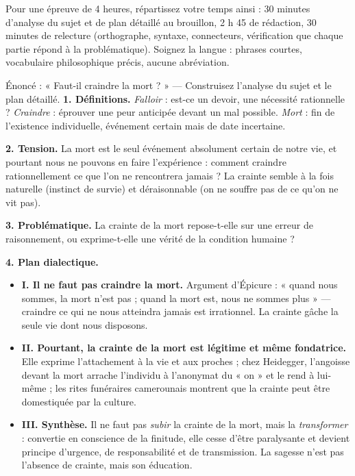 \documentclass[11pt]{article}
\newcounter{popsec}
\newcounter{popsub}
\newcommand{\courssub}[1]{%
  \stepcounter{popsub}%
  \par\vspace{9pt}\noindent{\popxbold\fontsize{11.5}{13}\selectfont\color{popink}{\color{poporange}\thepopsec.\thepopsub}\hspace{6pt}#1}\par\nopagebreak\vspace{4pt}
}
\begin{document}
\courssub{Entraînement au Baccalauréat technique}

Pour une épreuve de 4 heures, répartissez votre temps ainsi : 30 minutes d'analyse du sujet et de plan détaillé au brouillon, 2 h 45 de rédaction, 30 minutes de relecture (orthographe, syntaxe, connecteurs, vérification que chaque partie répond à la problématique). Soignez la langue : phrases courtes, vocabulaire philosophique précis, aucune abréviation.

\begin{exoresolu}
Énoncé : « Faut-il craindre la mort ? » — Construisez l'analyse du sujet et le plan détaillé.
\tcblower
\textbf{1. Définitions.} \emph{Falloir} : est-ce un devoir, une nécessité rationnelle ? \emph{Craindre} : éprouver une peur anticipée devant un mal possible. \emph{Mort} : fin de l'existence individuelle, événement certain mais de date incertaine.

\textbf{2. Tension.} La mort est le seul événement absolument certain de notre vie, et pourtant nous ne pouvons en faire l'expérience : comment craindre rationnellement ce que l'on ne rencontrera jamais ? La crainte semble à la fois naturelle (instinct de survie) et déraisonnable (on ne souffre pas de ce qu'on ne vit pas).

\textbf{3. Problématique.} La crainte de la mort repose-t-elle sur une erreur de raisonnement, ou exprime-t-elle une vérité de la condition humaine ?

\textbf{4. Plan dialectique.}
\begin{itemize}
\item \textbf{I. Il ne faut pas craindre la mort.} Argument d'Épicure : « quand nous sommes, la mort n'est pas ; quand la mort est, nous ne sommes plus » — craindre ce qui ne nous atteindra jamais est irrationnel. La crainte gâche la seule vie dont nous disposons.
\item \textbf{II. Pourtant, la crainte de la mort est légitime et même fondatrice.} Elle exprime l'attachement à la vie et aux proches ; chez Heidegger, l'angoisse devant la mort arrache l'individu à l'anonymat du « on » et le rend à lui-même ; les rites funéraires camerounais montrent que la crainte peut être domestiquée par la culture.
\item \textbf{III. Synthèse.} Il ne faut pas \emph{subir} la crainte de la mort, mais la \emph{transformer} : convertie en conscience de la finitude, elle cesse d'être paralysante et devient principe d'urgence, de responsabilité et de transmission. La sagesse n'est pas l'absence de crainte, mais son éducation.
\end{itemize}
\end{exoresolu}
\end{document}
